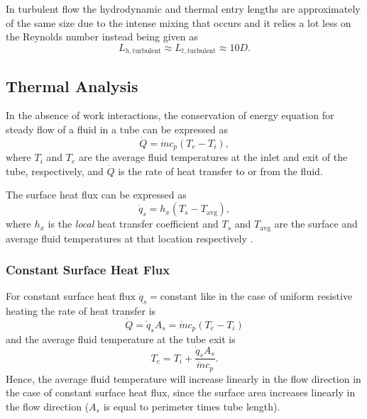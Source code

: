 In turbulent flow the hydrodynamic and thermal entry lengths are approximately of the same size due to the intense mixing that occurs and it relies a lot less on the Reynolds number instead being given as 
\begin{equation*}
  L_{h, \text{turbulent}} \approx L_{t, \text{turbulent}} \approx 10 D
.\end{equation*}


\subsection{Thermal Analysis}
In the absence of work interactions, the conservation of energy equation for steady flow of a fluid in a tube can be expressed as 
\begin{equation*}
  \dot{Q} = \dot{m} c_p \left( T_e - T_i \right)
,\end{equation*}
where $T_i$ and $T_e$ are the average fluid temperatures at the inlet and exit of the tube, respectively, and $\dot{Q}$ is the rate of heat transfer to or from the fluid.

The surface heat flux can be expressed as 
\begin{equation*}
  \dot{q}_s = h_x \left( T_s - T_{\mathrm{avg}} \right)
,\end{equation*}
where $h_x$ is the \textit{local} heat transfer coefficient and $T_s$ and $T_{\mathrm{avg}}$ are the surface and average fluid temperatures at that location respectively .

\subsubsection{Constant Surface Heat Flux}
For constant surface heat flux $\dot{q}_s = \mathrm{constant}$ like in the case of uniform resistive heating the rate of heat transfer is 
\begin{equation*}
  \dot{Q} = \dot{q}_s A_s = \dot{m} c_p (T_e - T_i)
\end{equation*}
and the average fluid temperature at the tube exit is 
\begin{equation*}
  T_e = T_i + \frac{\dot{q}_s A_s}{\dot{m} c_p}
.\end{equation*}
Hence, the average fluid temperature will increase linearly in the flow direction in the case of constant surface heat flux, since the surface area increases linearly in the flow direction ($A_s$ is equal to perimeter times tube length).

